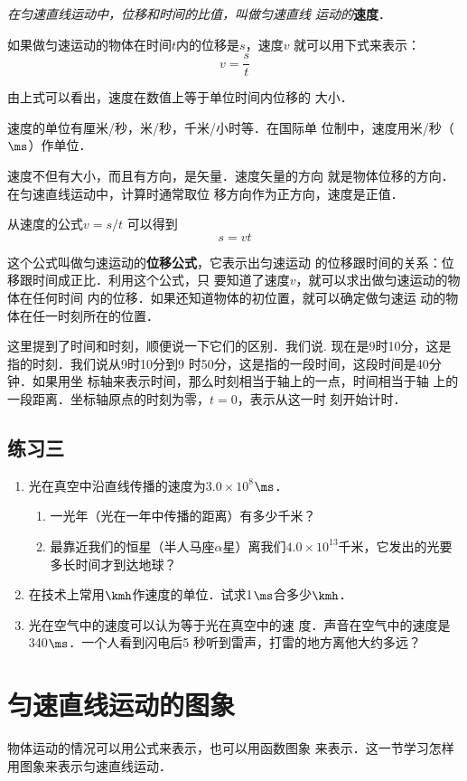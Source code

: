 \textit{在匀速直线运动中，位移和时间的比值，叫做匀速直线
运动的}\textbf{速度}．

如果做匀速运动的物体在时间$t$内的位移是$s$，速度$v$
就可以用下式来表示：
\[v=\frac{s}{t} \]

由上式可以看出，速度在数值上等于单位时间内位移的
大小．

    速度的单位有厘米/秒，米/秒，千米/小时等．在国际单
位制中，速度用米/秒（$\ms$）作单位．

    速度不但有大小，而且有方向，是矢量．速度矢量的方向
就是物体位移的方向．在匀速直线运动中，计算时通常取位
移方向作为正方向，速度是正值．

从速度的公式$v=s/t$
可以得到
  \[s=vt \]

这个公式叫做匀速运动的\textbf{位移公式}，它表示出匀速运动
的位移跟时间的关系：位移跟时间成正比．利用这个公式，只
要知道了速度$v$，就可以求出做匀速运动的物体在任何时间
内的位移．如果还知道物体的初位置，就可以确定做匀速运
动的物体在任一时刻所在的位置．

这里提到了时间和时刻，顺便说一下它们的区别．我们说.
现在是9时10分，这是指的时刻．我们说从9时10分到9
时50分，这是指的一段时间，这段时间是40分钟．如果用坐
标轴来表示时间，那么时刻相当于轴上的一点，时间相当于轴
上的一段距离．坐标轴原点的时刻为零，$t=0$，表示从这一时
刻开始计时．

\subsection*{练习三}

\begin{enumerate}
    \item 光在真空中沿直线传播的速度为$3.0\times 10^8$$\ms$．
\begin{enumerate}
    \item 一光年（光在一年中传播的距离）有多少千米？
    \item 最靠近我们的恒星（半人马座$\alpha$星）离我们$4.0\times 10^{13}$千米，它发出的光要多长时间才到达地球？
\end{enumerate}    
\item  在技术上常用$\kmh$作速度的单位．试求1$\ms$合多少$\kmh$．
\item 光在空气中的速度可以认为等于光在真空中的速
度．声音在空气中的速度是340$\ms$．一个人看到闪电后5
秒听到雷声，打雷的地方离他大约多远？

\end{enumerate}

\section{匀速直线运动的图象}
    物体运动的情况可以用公式来表示，也可以用函数图象
来表示．这一节学习怎样用图象来表示匀速直线运动．

